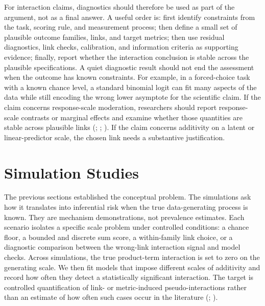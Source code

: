 \documentclass[
  man,
  longtable,
  nolmodern,
  notxfonts,
  notimes,
  colorlinks=true,linkcolor=blue,citecolor=blue,urlcolor=blue]{apa7}
\begin{document}
For interaction claims, diagnostics should therefore be used as part of
the argument, not as a final answer. A useful order is: first identify
constraints from the task, scoring rule, and measurement process; then
define a small set of plausible outcome families, links, and target
metrics; then use residual diagnostics, link checks, calibration, and
information criteria as supporting evidence; finally, report whether the
interaction conclusion is stable across the plausible specifications. A
quiet diagnostic result should not end the assessment when the outcome
has known constraints. For example, in a forced-choice task with a known
chance level, a standard binomial logit can fit many aspects of the data
while still encoding the wrong lower asymptote for the scientific claim.
If the claim concerns response-scale moderation, researchers should
report response-scale contrasts or marginal effects and examine whether
those quantities are stable across plausible links
(;
; ). If the claim concerns additivity on a latent or
linear-predictor scale, the chosen link needs a substantive
justification.

\section{Simulation Studies}\label{simulation-studies}

The previous sections established the conceptual problem. The
simulations ask how it translates into inferential risk when the true
data-generating process is known. They are mechanism demonstrations, not
prevalence estimates. Each scenario isolates a specific scale problem
under controlled conditions: a chance floor, a bounded and discrete sum
score, a within-family link choice, or a diagnostic comparison between
the wrong-link interaction signal and model checks. Across simulations,
the true product-term interaction is set to zero on the generating
scale. We then fit models that impose different scales of additivity and
record how often they detect a statistically significant interaction.
The target is controlled quantification of link- or metric-induced
pseudo-interactions rather than an estimate of how often such cases
occur in the literature (; ).
\end{document}
